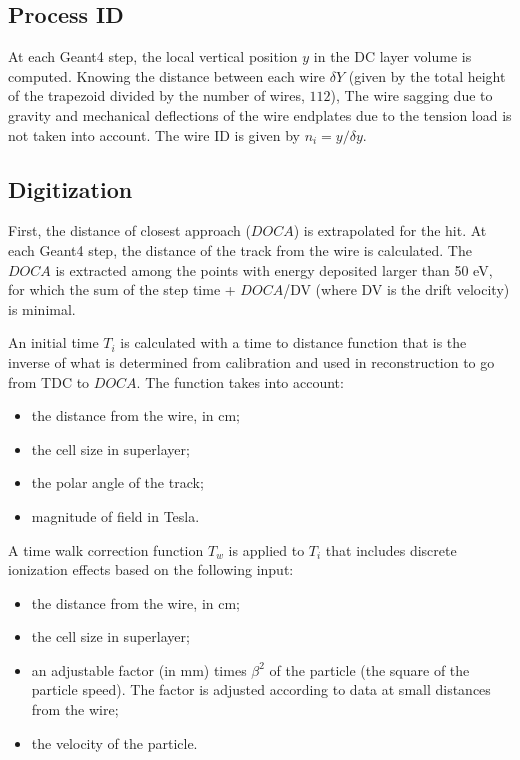 \subsection{Process ID}
At each Geant4 step, the local vertical position $y$ in the DC layer volume is computed. Knowing the distance
between each wire $\delta Y$ (given by the total height of the trapezoid divided by the number of wires, $112$),
The wire sagging due to gravity and mechanical deflections of the wire endplates due to the tension load is not taken into account.
The wire ID is given by $n_i = y / \delta y$.

\subsection{Digitization}

First, the distance of closest approach ($DOCA$) is extrapolated for the hit.
At each Geant4 step, the distance of the track from the wire is calculated.
The $DOCA$ is extracted among the points with energy deposited larger than 50 eV,
for which the sum of the step time + $DOCA$/DV (where DV is the drift velocity) is minimal.

An initial time $T_i$ is calculated with a time to distance function that is the inverse of
what is determined from calibration and used in reconstruction to go from TDC to $DOCA$.
The function takes into account:

\begin{itemize}
	\item the distance from the wire, in cm;
	\item the cell size in superlayer;
	\item the polar angle of the track;
	\item magnitude of field in Tesla.
\end{itemize}

A time walk correction function $T_w$ is applied to $T_i$ that includes discrete ionization effects based on the following input:

\begin{itemize}
	\item the distance from the wire, in cm;
	\item the cell size in superlayer;
	\item an adjustable factor (in mm) times $\beta^2$ of the particle (the square of the particle speed).
	      The factor is adjusted according to data at small distances from the wire;
	\item the velocity of the particle.
\end{itemize}

